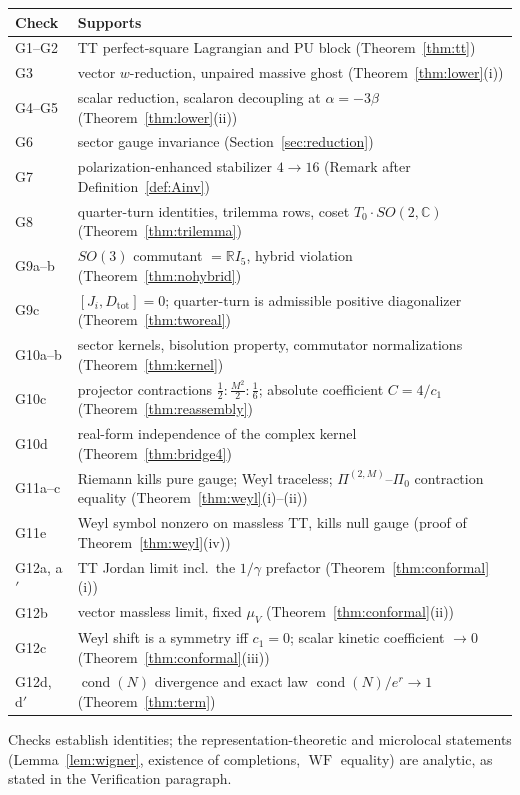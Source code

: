 \documentclass[11pt]{article}
\theoremstyle{definition}
\theoremstyle{remark}
\newcommand{\C}{\mathbb{C}}
\newcommand{\R}{\mathbb{R}}
\newcommand{\WF}{\operatorname{WF}}
\begin{document}
\begin{center}
\begin{tabular}{l l}
\hline
Check & Supports\\
\hline
G1--G2 & TT perfect-square Lagrangian and PU block
  (Theorem~\ref{thm:tt})\\
G3 & vector $w$-reduction, unpaired massive ghost
  (Theorem~\ref{thm:lower}(i))\\
G4--G5 & scalar reduction, scalaron decoupling at $\alpha=-3\beta$
  (Theorem~\ref{thm:lower}(ii))\\
G6 & sector gauge invariance (Section~\ref{sec:reduction})\\
G7 & polarization-enhanced stabilizer $4\to16$
  (Remark after Definition~\ref{def:Ainv})\\
G8 & quarter-turn identities, trilemma rows, coset
  $T_0\cdot SO(2,\C)$ (Theorem~\ref{thm:trilemma})\\
G9a--b & $SO(3)$ commutant $=\R I_5$, hybrid violation
  (Theorem~\ref{thm:nohybrid})\\
G9c & $[J_i,D_{\mathrm{tot}}]=0$; quarter-turn is admissible positive
  diagonalizer (Theorem~\ref{thm:tworeal})\\
G10a--b & sector kernels, bisolution property, commutator
  normalizations (Theorem~\ref{thm:kernel})\\
G10c & projector contractions $\tfrac12:\tfrac{M^2}2:\tfrac16$;
  absolute coefficient $C=4/c_1$ (Theorem~\ref{thm:reassembly})\\
G10d & real-form independence of the complex kernel
  (Theorem~\ref{thm:bridge4})\\
G11a--c & Riemann kills pure gauge; Weyl traceless;
  $\Pi^{(2,M)}$--$\Pi_0$ contraction equality
  (Theorem~\ref{thm:weyl}(i)--(ii))\\
G11e & Weyl symbol nonzero on massless TT, kills null gauge
  (proof of Theorem~\ref{thm:weyl}(iv))\\
G12a, a$'$ & TT Jordan limit incl.\ the $1/\gamma$ prefactor
  (Theorem~\ref{thm:conformal}(i))\\
G12b & vector massless limit, fixed $\mu_V$
  (Theorem~\ref{thm:conformal}(ii))\\
G12c & Weyl shift is a symmetry iff $c_1=0$; scalar kinetic
  coefficient $\to0$ (Theorem~\ref{thm:conformal}(iii))\\
G12d, d$'$ & $\operatorname{cond}(N)$ divergence and exact law
  $\operatorname{cond}(N)/e^r\to1$ (Theorem~\ref{thm:term})\\
\hline
\end{tabular}
\end{center}

Checks establish identities; the representation-theoretic and microlocal
statements (Lemma~\ref{lem:wigner}, existence of completions,
$\WF$ equality) are analytic, as stated in the Verification paragraph.
\end{document}
